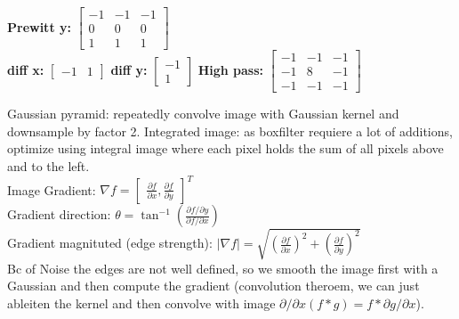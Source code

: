 \documentclass[a4paper,9pt]{article}
\begin{document}
\begin{subbox}
  \textbf{Prewitt y:} $\begin{bmatrix} -1 & -1 & -1 \\ 0 & 0 & 0 \\ 1 & 1 & 1 \end{bmatrix}$\\
  \textbf{diff x:} $\begin{bmatrix} -1 & 1 \end{bmatrix}$ \quad
  \textbf{diff y:} $\begin{bmatrix} -1 \\ 1 \end{bmatrix}$ \quad
  \textbf{High pass:} $\begin{bmatrix} -1 & -1 & -1 \\ -1 & 8 & -1 \\ -1 & -1 & -1 \end{bmatrix}$
\end{subbox}
Gaussian pyramid: repeatedly convolve image with Gaussian kernel and downsample by factor 2.
Integrated image: as boxfilter requiere a lot of additions, optimize using integral image where each pixel holds the sum of all pixels above and to the left.\\
Image Gradient: $\nabla f = \begin{bmatrix} \frac{\partial f}{\partial x},\frac{\partial f}{\partial y}  \end{bmatrix}^T$\\
Gradient direction: $\theta = \tan^{-1}(\frac{\partial f/\partial y}{\partial f/\partial x})$\\
Gradient magnituted (edge strength): $|\nabla f| = \sqrt{(\frac{\partial f}{\partial x})^2 + (\frac{\partial f}{\partial y})^2}$\\
Bc of Noise the edges are not well defined, so we smooth the image first with a Gaussian and then compute the gradient (convolution theroem, we can just ableiten the kernel and then convolve with image $\partial/\partial x  (f * g)= f * \partial g/\partial x$).
\end{document}
